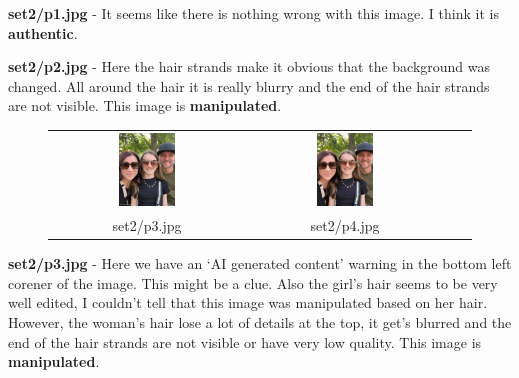 \documentclass[pdflatex,sn-mathphys-num]{sn-jnl}
\begin{document}
\par \textbf{set2/p1.jpg} \-- It seems like there is nothing wrong with this image. I think it is \textbf{authentic}.

\par \textbf{set2/p2.jpg} \-- Here the hair strands make it obvious that the background was changed. All around the
hair it is really blurry and the end of the hair strands are not visible. This image is \textbf{manipulated}.

\begin{figure}[htbp]
    \centering
    \begin{tabular}{cccc}
        \includegraphics[width=0.3\textwidth]{images/set2/p3.jpg} &
        \includegraphics[width=0.3\textwidth]{images/set2/p4.jpg} \\
        set2/p3.jpg & set2/p4.jpg
    \end{tabular}
    \label{fig:set2_p3_p4}
\end{figure}

\par \textbf{set2/p3.jpg} \-- Here we have an `AI generated content' warning in the bottom left corener of the image.
This might be a clue. Also the girl's hair seems to be very well edited, I couldn't tell that this image was manipulated
based on her hair. However, the woman's hair lose a lot of details at the top, it get's blurred and the end of the hair
strands are not visible or have very low quality. This image is \textbf{manipulated}.
\end{document}
